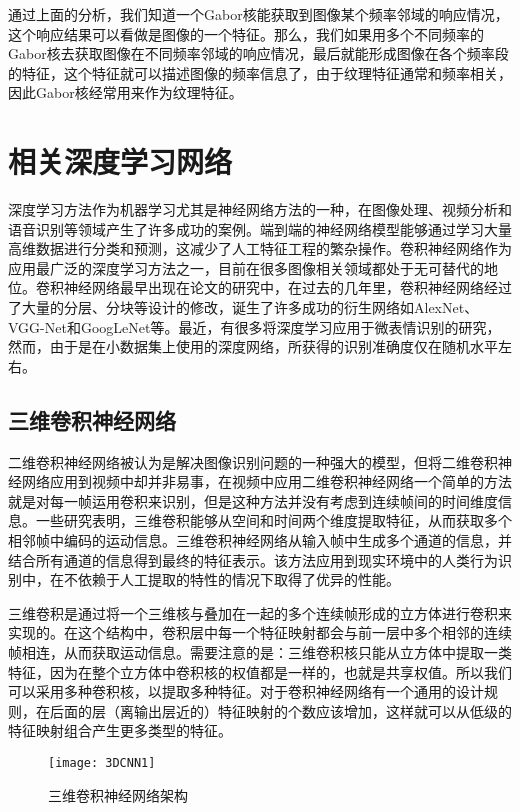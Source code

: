通过上面的分析，我们知道一个Gabor核能获取到图像某个频率邻域的响应情况，这个响应结果可以看做是图像的一个特征。那么，我们如果用多个不同频率的Gabor核去获取图像在不同频率邻域的响应情况，最后就能形成图像在各个频率段的特征，这个特征就可以描述图像的频率信息了，由于纹理特征通常和频率相关，因此Gabor核经常用来作为纹理特征。

\section{相关深度学习网络}

深度学习方法作为机器学习尤其是神经网络方法的一种，在图像处理、视频分析和语音识别等领域产生了许多成功的案例。端到端的神经网络模型能够通过学习大量高维数据进行分类和预测，这减少了人工特征工程的繁杂操作。卷积神经网络作为应用最广泛的深度学习方法之一，目前在很多图像相关领域都处于无可替代的地位。卷积神经网络最早出现在论文的研究中，在过去的几年里，卷积神经网络经过了大量的分层、分块等设计的修改，诞生了许多成功的衍生网络如AlexNet\citep{krizhevsky2012imagenet}、VGG-Net\citep{Simonyan2014Very}和GoogLeNet\citep{szegedy2015going}等。最近，有很多将深度学习应用于微表情识别的研究，然而，由于是在小数据集上使用的深度网络，所获得的识别准确度仅在随机水平左右。

\subsection{三维卷积神经网络}

二维卷积神经网络被认为是解决图像识别问题的一种强大的模型，但将二维卷积神经网络应用到视频中却并非易事，在视频中应用二维卷积神经网络一个简单的方法就是对每一帧运用卷积来识别，但是这种方法并没有考虑到连续帧间的时间维度信息。一些研究表明，三维卷积能够从空间和时间两个维度提取特征，从而获取多个相邻帧中编码的运动信息。三维卷积神经网络从输入帧中生成多个通道的信息，并结合所有通道的信息得到最终的特征表示。该方法应用到现实环境中的人类行为识别中，在不依赖于人工提取的特性的情况下取得了优异的性能\citep{Shuiwang20133D}。

三维卷积是通过将一个三维核与叠加在一起的多个连续帧形成的立方体进行卷积来实现的。在这个结构中，卷积层中每一个特征映射都会与前一层中多个相邻的连续帧相连，从而获取运动信息。需要注意的是：三维卷积核只能从立方体中提取一类特征，因为在整个立方体中卷积核的权值都是一样的，也就是共享权值。所以我们可以采用多种卷积核，以提取多种特征。对于卷积神经网络有一个通用的设计规则，在后面的层（离输出层近的）特征映射的个数应该增加，这样就可以从低级的特征映射组合产生更多类型的特征。

\begin{figure}[!htbp]
    \centering
    \texttt{[image: 3DCNN1]}
    \caption{三维卷积神经网络架构}
    \label{fig8}
\end{figure}

